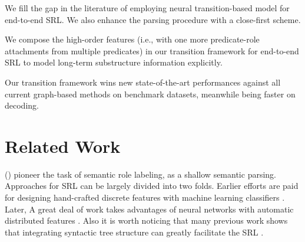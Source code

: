 \documentclass[letterpaper]{article} \usepackage{aaai21}  \usepackage{times}  \usepackage{helvet} \usepackage{courier}  \usepackage[hyphens]{url}  \usepackage{graphicx} \urlstyle{rm} \def\UrlFont{\rm}  \usepackage{natbib}  \usepackage{caption}
\begin{document}
\begin{CJK}{UTF8}{gbsn}
 We fill the gap in the literature of employing neural transition-based model for end-to-end SRL.
We also enhance the parsing procedure with a close-first scheme.


 We compose the high-order features (i.e., with one more predicate-role attachments from multiple predicates) in our transition framework for end-to-end SRL to model long-term substructure information explicitly.


 Our transition framework wins new state-of-the-art performances against all current graph-based methods on benchmark datasets, meanwhile being faster on decoding.




















\section{Related Work}



\citeauthor{gildea-jurafsky-2000-automatic} (\citeyear{gildea-jurafsky-2000-automatic}) pioneer the task of semantic role labeling, as a shallow semantic parsing.
Approaches for SRL can be largely divided into two folds.
Earlier efforts are paid for designing hand-crafted discrete features with machine learning classifiers \cite{pradhan-etal-2005-semantic,PunyakanokRY08,zhao-etal-2009-multilingual-dependency}.
Later, A great deal of work takes advantages of neural networks with automatic distributed features \cite{fitzgerald-etal-2015-semantic,roth-lapata-2016-neural,marcheggiani-titov-2017-encoding,strubell-etal-2018-linguistically,Fei06295}.
Also it is worth noticing that many previous work shows that integrating syntactic tree structure can greatly facilitate the SRL \cite{marcheggiani-etal-2017-simple,zhang-etal-2019-syntax-enhanced,Crossfei9165903}.



\end{CJK}
\end{document}
